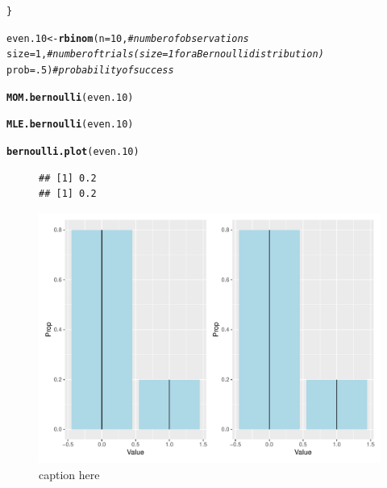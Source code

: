 \documentclass{article}\usepackage[]{graphicx}\usepackage[]{color}
\makeatletter
\def\maxwidth{ %
  \ifdim\Gin@nat@width>\linewidth
    \linewidth
  \else
    \Gin@nat@width
  \fi
}
\newcommand{\hlnum}[1]{\textcolor[rgb]{0.686,0.059,0.569}{#1}}%
\newcommand{\hlcom}[1]{\textcolor[rgb]{0.678,0.584,0.686}{\textit{#1}}}%
\newcommand{\hlstd}[1]{\textcolor[rgb]{0.345,0.345,0.345}{#1}}%
\newcommand{\hlkwb}[1]{\textcolor[rgb]{0.69,0.353,0.396}{#1}}%
\newcommand{\hlkwc}[1]{\textcolor[rgb]{0.333,0.667,0.333}{#1}}%
\newcommand{\hlkwd}[1]{\textcolor[rgb]{0.737,0.353,0.396}{\textbf{#1}}}%
\newenvironment{kframe}{%
 \def\at@end@of@kframe{}%
 \ifinner\ifhmode%
  \def\at@end@of@kframe{\end{minipage}}%
  \begin{minipage}{\columnwidth}%
 \fi\fi%
 \def\FrameCommand##1{\hskip\@totalleftmargin \hskip-\fboxsep
 \colorbox{shadecolor}{##1}\hskip-\fboxsep
     \hskip-\linewidth \hskip-\@totalleftmargin \hskip\columnwidth}%
 \MakeFramed {\advance\hsize-\width
   \@totalleftmargin\z@ \linewidth\hsize
   \@setminipage}}%
 {\par\unskip\endMakeFramed%
 \at@end@of@kframe}
\newenvironment{knitrout}{}{} %
\makeatother
\begin{document}
\begin{enumerate}
\begin{enumerate}
\begin{knitrout}
\begin{kframe}
\begin{alltt}
\hlstd{\}}
\end{alltt}
\end{kframe}
\end{knitrout}

\begin{knitrout}
\color{fgcolor}\begin{kframe}
\begin{alltt}
\hlstd{even.10} \hlkwb{<-} \hlkwd{rbinom}\hlstd{(}\hlkwc{n}\hlstd{=}\hlnum{10}\hlstd{,}        \hlcom{#number of observations}
                    \hlkwc{size}\hlstd{=}\hlnum{1}\hlstd{,}        \hlcom{#number of trials (size=1 for a Bernoulli distribution)}
                    \hlkwc{prob}\hlstd{=}\hlnum{.5}\hlstd{)}       \hlcom{#probability of success}

\hlkwd{MOM.bernoulli}\hlstd{(even.10)}

\hlkwd{MLE.bernoulli}\hlstd{(even.10)}

\hlkwd{bernoulli.plot}\hlstd{(even.10)}
\end{alltt}
\end{kframe}
\end{knitrout}

\begin{figure}[H]
  \begin{center}
\begin{knitrout}
\color{fgcolor}\begin{kframe}
\begin{verbatim}
## [1] 0.2
## [1] 0.2
\end{verbatim}
\end{kframe}
\includegraphics[width=\maxwidth]{figure/unnamed-chunk-3-1} 
\end{knitrout}
    \caption{caption here}
    \label{p4plot1}%
  \end{center}
\end{figure}


\end{enumerate}
\end{enumerate}
\end{document}
